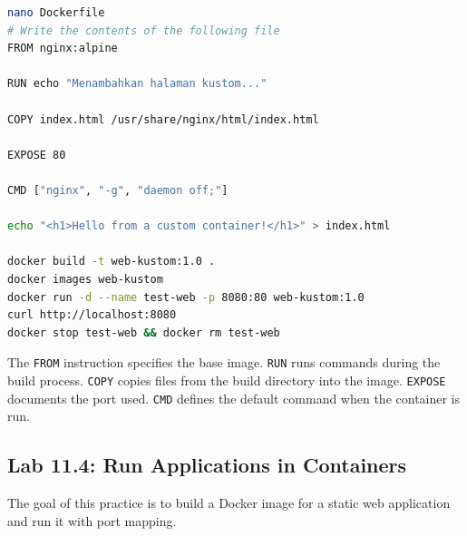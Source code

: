 \begin{lstlisting}[language=bash, caption={Example Dockerfile and build process}]
nano Dockerfile
# Write the contents of the following file
FROM nginx:alpine

RUN echo "Menambahkan halaman kustom..."

COPY index.html /usr/share/nginx/html/index.html

EXPOSE 80

CMD ["nginx", "-g", "daemon off;"]

echo "<h1>Hello from a custom container!</h1>" > index.html

docker build -t web-kustom:1.0 .
docker images web-kustom
docker run -d --name test-web -p 8080:80 web-kustom:1.0
curl http://localhost:8080
docker stop test-web && docker rm test-web
\end{lstlisting}

The \texttt{FROM} instruction specifies the base image. \texttt{RUN} runs commands during the build process. \texttt{COPY} copies files from the build directory into the image. \texttt{EXPOSE} documents the port used. \texttt{CMD} defines the default command when the container is run.

\subsection*{Lab 11.4: Run Applications in Containers}

The goal of this practice is to build a Docker image for a static web application and run it with port mapping.

